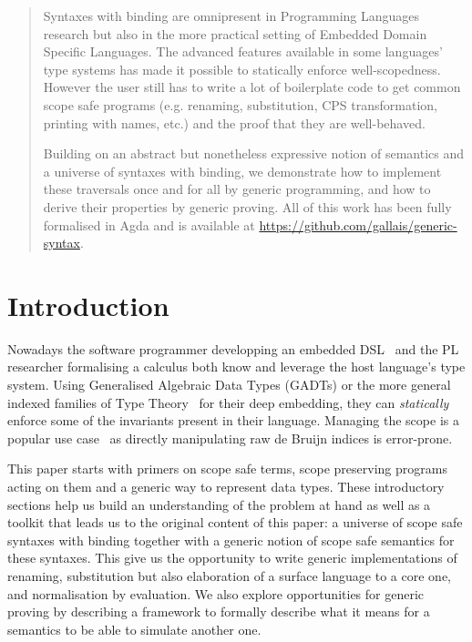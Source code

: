 \begin{abstract}
Syntaxes with binding are omnipresent in Programming Languages
research but also in the more practical setting of Embedded
Domain Specific Languages. The advanced features available in
some languages' type systems has made it possible to statically
enforce well-scopedness. However the user still has to write a
lot of boilerplate code to get common scope safe programs (e.g.
renaming, substitution, CPS transformation, printing with names,
etc.) and the proof that they are well-behaved.

Building on an abstract but nonetheless expressive notion of
semantics and a universe of syntaxes with binding, we demonstrate
how to implement these traversals once and for all by generic
programming, and how to derive their properties by generic proving.
All of this work has been fully formalised in Agda and is available
at \url{https://github.com/gallais/generic-syntax}.
\end{abstract}

\section{Introduction}

Nowadays the software programmer developping an embedded DSL~\cite{hudak1996building}
and the PL researcher formalising a calculus both know and
leverage the host language's type system. Using Generalised
Algebraic Data Types (GADTs) or the more general indexed
families of Type Theory~\cite{dybjer1994inductive} for their deep embedding, they can
\emph{statically} enforce some of the invariants present in
their language. Managing the scope is a popular use case~\cite{altenkirch1999monadic} as
directly manipulating raw de Bruijn indices is error-prone.

This paper starts with primers on scope safe terms, scope preserving
programs acting on them and a generic way to represent data types.
These introductory sections help us build an understanding of the
problem at hand as well as a toolkit that leads us to the original
content of this paper: a universe of scope safe syntaxes with binding
together with a generic notion of scope safe semantics for these syntaxes.
This give us the opportunity to write generic implementations of renaming,
substitution but also elaboration of a surface language to a core one,
and normalisation by evaluation. We also explore opportunities for
generic proving by describing a framework to formally describe what
it means for a semantics to be able to simulate another one.

